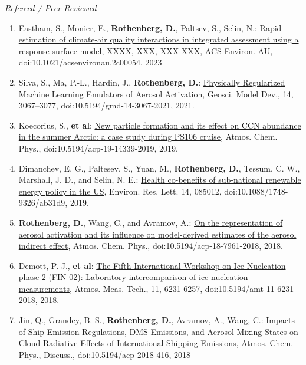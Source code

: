\documentclass[11pt,letterpaper]{article}
\begin{document}
 \bigskip
 \emph{Refereed / Peer-Reviewed}
 \medskip
 \begin{enumerate}[itemindent=-10pt]

 \item Eastham, S., Monier, E., \textbf{Rothenberg, D.}, Paltsev, S., Selin, N.: \href{https://pubs.acs.org/doi/10.1021/acsenvironau.2c00054}{Rapid estimation of climate-air quality interactions in integrated assessment using a response surface model}, XXXX, XXX, XXX-XXX, ACS Environ. AU, doi:10.1021/acsenvironau.2c00054, 2023

 \item Silva, S., Ma, P.-L., Hardin, J., \textbf{Rothenberg, D.}: \href{https://doi.org/10.5194/gmd-14-3067-2021}{Physically Regularized Machine Learning Emulators of Aerosol Activation}, Geosci. Model Dev., 14, 3067–3077, doi:10.5194/gmd-14-3067-2021, 2021.

 \item Koecorius, S., \textbf{et al}: \href{https://doi.org/10.5194/acp-19-14339-2019}{New particle formation and its effect on CCN abundance in the summer Arctic: a case study during PS106 cruise}, Atmos. Chem. Phys., doi:10.5194/acp-19-14339-2019, 2019.

 \item Dimanchev, E. G., Paltesev, S., Yuan, M., \textbf{Rothenberg, D.}, Tessum, C. W., Marshall, J. D., and Selin, N. E.: \href{https://doi.org/10.1088/1748-9326/ab31d9}{Health co-benefits of sub-national renewable energy policy in the US}, Environ. Res. Lett. 14, 085012, doi:10.1088/1748-9326/ab31d9, 2019.

 \item \textbf{Rothenberg, D.}, Wang, C., and Avramov, A.: \href{http://doi.org/10.5194/acp-18-7961-2018}{On the representation of aerosol activation and its influence on model-derived estimates of the aerosol indirect effect}, Atmos. Chem. Phys., doi:10.5194/acp-18-7961-2018, 2018.

 \item Demott, P. J., \textbf{et al}: \href{https://doi.org/10.5194/amt-11-6231-2018}{The Fifth International Workshop on Ice Nucleation phase 2 (FIN-02): Laboratory intercomparison of ice nucleation measurements}, Atmos. Meas. Tech., 11, 6231-6257, doi:10.5194/amt-11-6231-2018, 2018.

 \item Jin, Q., Grandey, B. S., \textbf{Rothenberg, D.}, Avramov, A., Wang, C.: \href{https://doi.org/10.5194/acp-2018-416}{Impacts of Ship Emission Regulations, DMS Emissions, and Aerosol Mixing States on Cloud Radiative Effects of International Shipping Emissions}, Atmos. Chem. Phys., Discuss., doi:10.5194/acp-2018-416, 2018


\end{enumerate}
\end{document}
